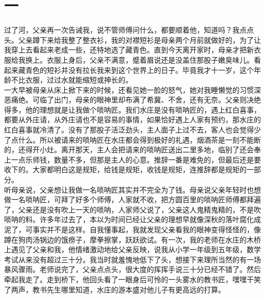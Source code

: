 \fancyhead[RO]{\thepage} %
\fancyhead[LE]{\thepage} %
\fancyfoot[LE,RO]{}
\fancyfoot[LO,CE]{}
\fancyfoot[CO,RE]{}
\chapter*{一}
过了河，父亲再一次告诫我，说不管师傅问什么，都要顺着他，知道吗？我点点头。父亲蹲下来给我整了整衣衫，我的对襟短衫是母亲两个月前就做好的，为了让我穿上去看起来老成一些，还特地选了藏青色。直到今天离开家时，母亲才把新衣服给我换上。衣服上身后，父亲不满意，蹙着眉说还是没盖住那股子嫩臭味儿。看起来藏青色的短衫并没有拉长我来到这个世界上的日子。毕竟我才十一岁，这个年龄不比衣服，过过水就能缩短或抻长的。
\\

一大早被母亲从床上掀下来的时候，还看见她一脸的怒气，她对我睡懒觉的习惯深恶痛绝。可临了出门，母亲的眼神里却布满了希冀、不舍，还有无奈。父亲则决绝得多，他的理想就是让我做个唢呐匠。我们水庄是没有唢呐匠的，遇上红白喜事，都要从外庄请，从外庄请也不是容易的事情，如果恰好遇上人家有预约，那水庄的红白喜事就冷清了。没有了那股子活泛劲头，主人面子上过不去，客人也会觉得少了点什么。所以被请来的唢呐匠在水庄都会得到极好的礼遇，烟酒茶是一刻不能断的，还得开小灶。离开那天，主人会把请来的唢呐匠送出二里多地，临别了还会奉上一点乐师钱，数量不多，但那是主人的心意。推辞一番是难免的，但最后还是要收下的。大家都明白这是规矩，给钱是规矩，收钱是规矩，连推辞都是规矩的一部分。
\\

听母亲说，父亲想让我做一名唢呐匠其实并不完全为了钱。母亲说父亲年轻时也想做一名唢呐匠，可拜了好多个师傅，人家就不收，把方圆百里的唢呐匠师傅都拜遍了，父亲还是没有吹上一天的唢呐，人家师父说了，父亲这人鬼精鬼精的，不是吹唢呐的料。许多年过去了，本以为时间已经让父亲的理想早就像深秋的落叶腐化成泥了，可事实并不是这样。自我懂事起，我就发现父亲看我的眼神变得怪怪的，像蹲在狗肉汤锅边的饿痨子，摩拳擦掌，跃跃欲试。有一次，我的老师在水庄的木桥上遇见了父亲和我，他情绪激动地给父亲反映，说我从小学一年级到五年级，数学考试从来没有超过三十分。我当时就羞愧地低下了头，想接下来理所当然的有一场暴风骤雨。老师说完了，父亲点点头，很大度的挥挥手说三十分已经不错了。然后牵起我走了。走到桥下，他回头看了一眼身后可怜的一头雾水的教书匠，嘿嘿干笑了两声，教书先生哪里知道，水庄的游本盛对他儿子有更高远的打算。
\\


